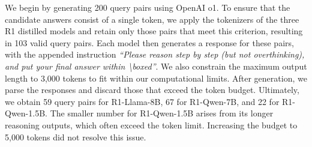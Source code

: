 \documentclass[11pt]{article}
\begin{document}
We begin by generating 200 query pairs using OpenAI o1. To ensure that the candidate answers consist of a single token, we apply the tokenizers of the three R1 distilled models and retain only those pairs that meet this criterion, resulting in 103 valid query pairs. Each model then generates a response for these pairs, with the appended instruction \textit{``Please reason step by step (but not overthinking), and put your final answer within \textbackslash boxed{}''}. We also constrain the maximum output length to 3,000 tokens to fit within our computational limits. After generation, we parse the responses and discard those that exceed the token budget. Ultimately, we obtain 59 query pairs for R1-Llama-8B, 67 for R1-Qwen-7B, and 22 for R1-Qwen-1.5B. The smaller number for R1-Qwen-1.5B arises from its longer reasoning outputs, which often exceed the token limit. Increasing the budget to 5,000 tokens did not resolve this issue.
\end{document}
